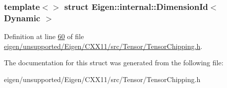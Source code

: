 \subsubsection*{template$<$$>$\newline
struct Eigen\+::internal\+::\+Dimension\+Id$<$ Dynamic $>$}



Definition at line \hyperlink{eigen_2unsupported_2_eigen_2_c_x_x11_2src_2_tensor_2_tensor_chipping_8h_source_l00060}{60} of file \hyperlink{eigen_2unsupported_2_eigen_2_c_x_x11_2src_2_tensor_2_tensor_chipping_8h_source}{eigen/unsupported/\+Eigen/\+C\+X\+X11/src/\+Tensor/\+Tensor\+Chipping.\+h}.



The documentation for this struct was generated from the following file\+:\begin{DoxyCompactItemize}
\item 
eigen/unsupported/\+Eigen/\+C\+X\+X11/src/\+Tensor/\+Tensor\+Chipping.\+h\end{DoxyCompactItemize}
